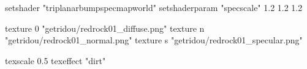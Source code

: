 setshader "triplanarbumpspecmapworld"
setshaderparam "specscale" 1.2 1.2 1.2

   texture 0 "getridou/redrock01_diffuse.png"
   texture n "getridou/redrock01_normal.png"
   texture s "getridou/redrock01_specular.png"

texscale 0.5
texeffect "dirt"
